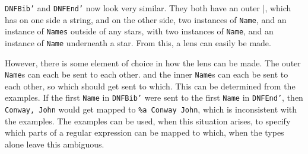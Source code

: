 \texttt{DNFBib'} and \texttt{DNFEnd'} now look very similar.
They both have an outer |, which has on one side a string, and on the other
side, two instances of \texttt{Name}, and an instance of \texttt{Names} outside
of any stars,
with two instances of \texttt{Name}, and an instance of \texttt{Name} underneath
a star.
From this, a lens can easily be made.

However, there is some element of choice in how the lens can be made.
The outer \texttt{Name}s can each be sent to each other.
and the inner \texttt{Name}s can each be sent to each other, so which
should get sent to which.
This can be determined from the examples.
If the first \texttt{Name} in \texttt{DNFBib'} were sent to the first
\texttt{Name} in \texttt{DNFEnd'}, then \texttt{Conway, John} would
get mapped to \texttt{\%a Conway John}, which is inconsistent with the
examples.
The examples can be used, when this situation arises, to specify which parts
of a regular expression can be mapped to which, when the types alone leave
this ambiguous.

